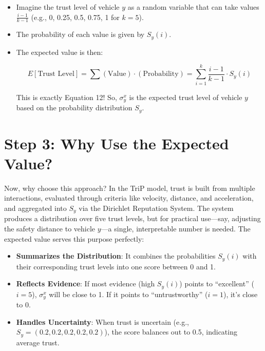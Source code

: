 \documentclass{article}
\begin{document}
\begin{itemize}
    \item Imagine the trust level of vehicle \(y\) as a random variable that can take values \(\frac{i-1}{k-1}\) (e.g., 0, 0.25, 0.5, 0.75, 1 for \(k = 5\)).
    \item The probability of each value is given by \(S_y(i)\).
    \item The expected value is then:

    \[
    E[\text{Trust Level}] = \sum (\text{Value}) \cdot (\text{Probability}) = \sum_{i=1}^k \frac{i-1}{k-1} \cdot S_y(i)
    \]

    This is exactly Equation 12! So, \(\sigma_y^x\) is the expected trust level of vehicle \(y\) based on the probability distribution \(S_y\).
\end{itemize}

\section*{Step 3: Why Use the Expected Value?}
Now, why choose this approach? In the TriP model, trust is built from multiple interactions, evaluated through criteria like velocity, distance, and acceleration, and aggregated into \(S_y\) via the Dirichlet Reputation System. The system produces a distribution over five trust levels, but for practical use—say, adjusting the safety distance to vehicle \(y\)—a single, interpretable number is needed. The expected value serves this purpose perfectly:

\begin{itemize}
    \item \textbf{Summarizes the Distribution}: It combines the probabilities \(S_y(i)\) with their corresponding trust levels into one score between 0 and 1.
    \item \textbf{Reflects Evidence}: If most evidence (high \(S_y(i)\)) points to “excellent” (\(i = 5\)), \(\sigma_y^x\) will be close to 1. If it points to “untrustworthy” (\(i = 1\)), it’s close to 0.
    \item \textbf{Handles Uncertainty}: When trust is uncertain (e.g., \(S_y = (0.2, 0.2, 0.2, 0.2, 0.2)\)), the score balances out to 0.5, indicating average trust.
\end{itemize}
\end{document}
